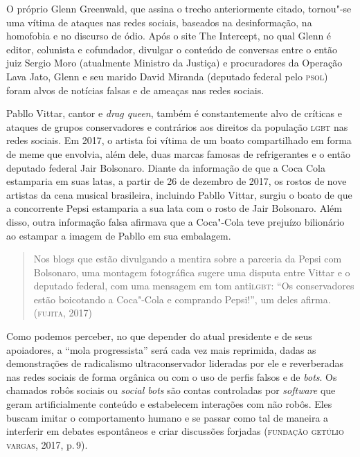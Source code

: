 O próprio Glenn Greenwald, que assina o trecho anteriormente citado,
tornou"-se uma vítima de ataques nas redes sociais, baseados na
desinformação, na homofobia e no discurso de ódio. Após o site The
Intercept, no qual Glenn é editor, colunista e cofundador, divulgar o
conteúdo de conversas entre o então juiz Sergio Moro (atualmente
Ministro da Justiça) e procuradores da Operação Lava Jato, Glenn e seu
marido David Miranda (deputado federal pelo \textsc{psol}) foram alvos de
notícias falsas e de ameaças nas redes sociais.

Pabllo Vittar, cantor e \textit{drag queen}, também é constantemente alvo
de críticas e ataques de grupos conservadores e contrários aos direitos
da população \textsc{lgbt} nas redes sociais. Em 2017, o artista foi vítima de um
boato compartilhado em forma de meme que envolvia, além dele, duas
marcas famosas de refrigerantes e o então deputado federal Jair
Bolsonaro. Diante da informação de que a Coca Cola estamparia em suas
latas, a partir de 26 de dezembro de 2017, os rostos de nove artistas da
cena musical brasileira, incluindo Pabllo Vittar, surgiu o boato de que
a concorrente Pepsi estamparia a sua lata com o rosto de Jair Bolsonaro.
Além disso, outra informação falsa afirmava que a Coca"-Cola
teve prejuízo bilionário ao estampar a imagem de Pabllo em sua
embalagem.

\begin{quote}
Nos blogs que estão divulgando a mentira sobre a parceria da Pepsi com
Bolsonaro, uma montagem fotográfica sugere uma disputa entre Vittar e o
deputado federal, com uma mensagem em tom anti\textsc{lgbt}: ``Os conservadores
estão boicotando a Coca"-Cola e comprando Pepsi!'', um deles afirma.
(\textsc{fujita}, 2017)
\end{quote}



Como podemos perceber, no que depender do atual presidente e de seus
apoiadores, a ``mola progressista'' será cada vez mais reprimida, dadas
as demonstrações de radicalismo ultraconservador lideradas por ele e
reverberadas nas redes sociais de forma orgânica ou com o uso de perfis
falsos e de \textit{bots}. Os chamados robôs sociais ou \textit{social bots} são
contas controladas por \textit{software} que geram artificialmente conteúdo e
estabelecem interações com não robôs. Eles buscam imitar o comportamento
humano e se passar como tal de maneira a interferir em debates
espontâneos e criar discussões forjadas (\textsc{fundação getúlio vargas}, 2017,
p.\,9).

